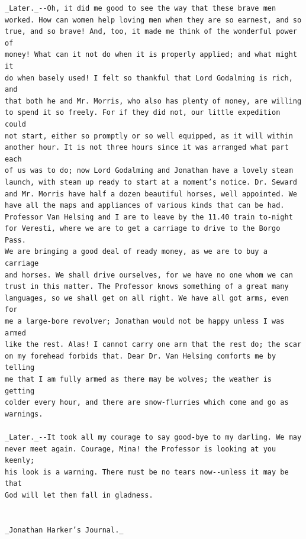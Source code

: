 \documentclass{article}
\begin{document}
\begin{verbatim}
_Later._--Oh, it did me good to see the way that these brave men
worked. How can women help loving men when they are so earnest, and so
true, and so brave! And, too, it made me think of the wonderful power of
money! What can it not do when it is properly applied; and what might it
do when basely used! I felt so thankful that Lord Godalming is rich, and
that both he and Mr. Morris, who also has plenty of money, are willing
to spend it so freely. For if they did not, our little expedition could
not start, either so promptly or so well equipped, as it will within
another hour. It is not three hours since it was arranged what part each
of us was to do; now Lord Godalming and Jonathan have a lovely steam
launch, with steam up ready to start at a moment’s notice. Dr. Seward
and Mr. Morris have half a dozen beautiful horses, well appointed. We
have all the maps and appliances of various kinds that can be had.
Professor Van Helsing and I are to leave by the 11.40 train to-night
for Veresti, where we are to get a carriage to drive to the Borgo Pass.
We are bringing a good deal of ready money, as we are to buy a carriage
and horses. We shall drive ourselves, for we have no one whom we can
trust in this matter. The Professor knows something of a great many
languages, so we shall get on all right. We have all got arms, even for
me a large-bore revolver; Jonathan would not be happy unless I was armed
like the rest. Alas! I cannot carry one arm that the rest do; the scar
on my forehead forbids that. Dear Dr. Van Helsing comforts me by telling
me that I am fully armed as there may be wolves; the weather is getting
colder every hour, and there are snow-flurries which come and go as
warnings.

_Later._--It took all my courage to say good-bye to my darling. We may
never meet again. Courage, Mina! the Professor is looking at you keenly;
his look is a warning. There must be no tears now--unless it may be that
God will let them fall in gladness.


_Jonathan Harker’s Journal._


\end{verbatim}
\end{document}
